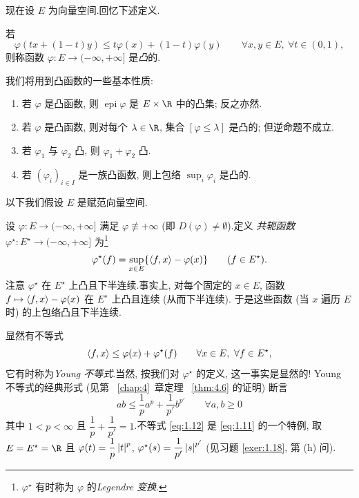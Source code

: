 现在设 $E$ 为向量空间.回忆下述定义.

\begin{definition}
若
\begin{equation*}
\varphi(tx+(1-t)y)\le t\varphi(x)+(1-t)\varphi(y)
\qquad \forall x,y\in E,\ \forall t\in(0,1),
\end{equation*}
则称函数 $\varphi:E\to(-\infty,+\infty]$ 是\emph{凸}的.
\end{definition}

我们将用到凸函数的一些基本性质:

\begin{enumerate}[label=\arabic*., leftmargin=2.2em, itemsep=0.25em]
	\item 若 $\varphi$ 是凸函数, 则 $\operatorname{epi}\varphi$ 是 $E\times\R$ 中的凸集;
	      反之亦然.
	\item 若 $\varphi$ 是凸函数, 则对每个 $\lambda\in\R$, 集合 $[\varphi\le\lambda]$ 是凸的;
	      但逆命题不成立.
	\item 若 $\varphi_1$ 与 $\varphi_2$ 凸, 则 $\varphi_1+\varphi_2$ 凸.
	\item 若 $(\varphi_i)_{i\in I}$ 是一族凸函数, 则上包络 $\sup_i\varphi_i$ 是凸的.
\end{enumerate}

以下我们假设 $E$ 是赋范向量空间.

\begin{definition}
设 $\varphi:E\to(-\infty,+\infty]$ 满足 $\varphi\not\equiv+\infty$
(即 $D(\varphi)\ne\emptyset$).定义\emph{
共轭函数}
$\varphi^\star:E^\star\to(-\infty,+\infty]$ 为\footnote{$\varphi^\star$ 有时称为 $\varphi$
的\emph{Legendre 变换}.}
\begin{equation*}
\varphi^\star(f)=\sup_{x\in E}\{\left\langle f,x\right\rangle-\varphi(x)\}\qquad (f\in E^\star).
\end{equation*}
注意 $\varphi^\star$ 在 $E^\star$ 上凸且下半连续.事实上, 对每个固定的 $x\in E$,
函数 $f\mapsto\left\langle f,x\right\rangle-\varphi(x)$ 在 $E^\star$ 上凸且连续 (从而下半连续).
于是这些函数 (当 $x$ 遍历 $E$ 时) 的上包络凸且下半连续.
\end{definition}

\begin{remark}
\label{rem:1.7}
显然有不等式
\begin{equation}
\left\langle f,x\right\rangle\le\varphi(x)+\varphi^\star(f)\qquad \forall x\in E,\ \forall f\in E^\star,
  \label{eq:1.11}
\end{equation}
它有时称为\emph{Young 不等式}.当然, 按我们对 $\varphi^\star$ 的定义, 这一事实是显然的!
Young 不等式的经典形式 (见第~
\ref{chap:4}~章定理~
\ref{thm:4.6} 的证明) 断言
\begin{equation}
ab\le\frac{1}{p}a^p+\frac{1}{p'}b^{p'}\qquad \forall a,b\ge 0
  \label{eq:1.12}
\end{equation}
其中 $1<p<\infty$ 且 $\dfrac{1}{p}+\dfrac{1}{p'}=1$.不等式 \eqref{eq:1.12} 是
\eqref{eq:1.11} 的一个特例, 取 $E=E^\star=\R$ 且
$\varphi(t)=\dfrac{1}{p}\left|t\right|^p$, $\varphi^\star(s)=\dfrac{1}{p'}\left|s\right|^{p'}$
(见习题  \ref{exer:1.18}, 第 (h) 问).
\end{remark}

